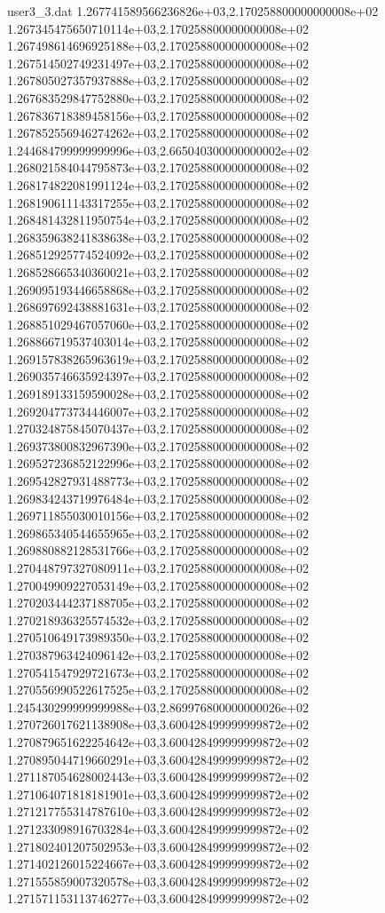 \begin{filecontents}{user3_3.dat}
1.267741589566236826e+03,2.170258800000000008e+02
1.267345475650710114e+03,2.170258800000000008e+02
1.267498614696925188e+03,2.170258800000000008e+02
1.267514502749231497e+03,2.170258800000000008e+02
1.267805027357937888e+03,2.170258800000000008e+02
1.267683529847752880e+03,2.170258800000000008e+02
1.267836718389458156e+03,2.170258800000000008e+02
1.267852556946274262e+03,2.170258800000000008e+02
1.244684799999999996e+03,2.665040300000000002e+02
1.268021584044795873e+03,2.170258800000000008e+02
1.268174822081991124e+03,2.170258800000000008e+02
1.268190611143317255e+03,2.170258800000000008e+02
1.268481432811950754e+03,2.170258800000000008e+02
1.268359638241838638e+03,2.170258800000000008e+02
1.268512925774524092e+03,2.170258800000000008e+02
1.268528665340360021e+03,2.170258800000000008e+02
1.269095193446658868e+03,2.170258800000000008e+02
1.268697692438881631e+03,2.170258800000000008e+02
1.268851029467057060e+03,2.170258800000000008e+02
1.268866719537403014e+03,2.170258800000000008e+02
1.269157838265963619e+03,2.170258800000000008e+02
1.269035746635924397e+03,2.170258800000000008e+02
1.269189133159590028e+03,2.170258800000000008e+02
1.269204773734446007e+03,2.170258800000000008e+02
1.270324875845070437e+03,2.170258800000000008e+02
1.269373800832967390e+03,2.170258800000000008e+02
1.269527236852122996e+03,2.170258800000000008e+02
1.269542827931488773e+03,2.170258800000000008e+02
1.269834243719976484e+03,2.170258800000000008e+02
1.269711855030010156e+03,2.170258800000000008e+02
1.269865340544655965e+03,2.170258800000000008e+02
1.269880882128531766e+03,2.170258800000000008e+02
1.270448797327080911e+03,2.170258800000000008e+02
1.270049909227053149e+03,2.170258800000000008e+02
1.270203444237188705e+03,2.170258800000000008e+02
1.270218936325574532e+03,2.170258800000000008e+02
1.270510649173989350e+03,2.170258800000000008e+02
1.270387963424096142e+03,2.170258800000000008e+02
1.270541547929721673e+03,2.170258800000000008e+02
1.270556990522617525e+03,2.170258800000000008e+02
1.245430299999999988e+03,2.869976800000000026e+02
1.270726017621138908e+03,3.600428499999999872e+02
1.270879651622254642e+03,3.600428499999999872e+02
1.270895044719660291e+03,3.600428499999999872e+02
1.271187054628002443e+03,3.600428499999999872e+02
1.271064071818181901e+03,3.600428499999999872e+02
1.271217755314787610e+03,3.600428499999999872e+02
1.271233098916703284e+03,3.600428499999999872e+02
1.271802401207502953e+03,3.600428499999999872e+02
1.271402126015224667e+03,3.600428499999999872e+02
1.271555859007320578e+03,3.600428499999999872e+02
1.271571153113746277e+03,3.600428499999999872e+02

\end{filecontents}

